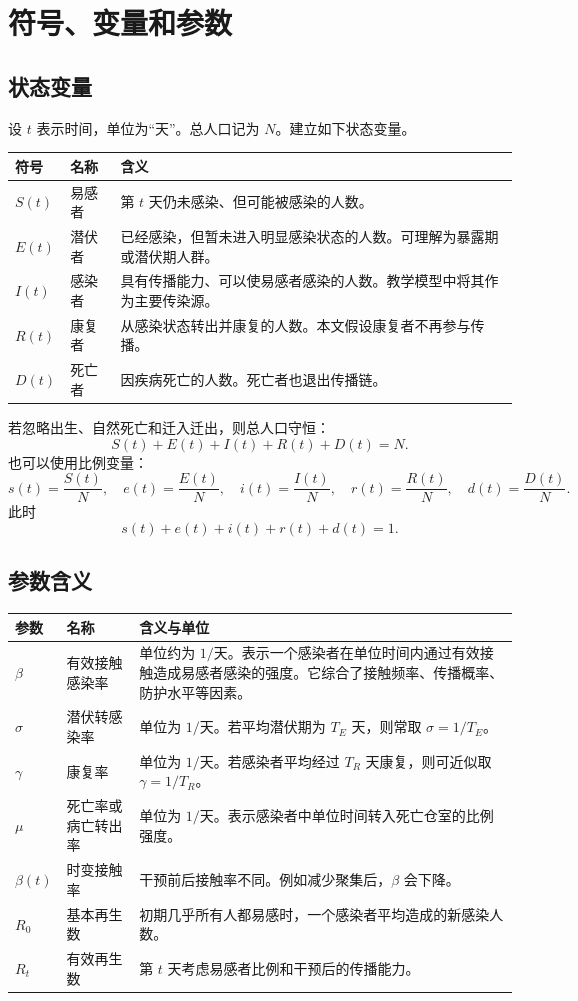 \documentclass[UTF8,12pt,a4paper]{ctexart}
\begin{document}
\section{符号、变量和参数}
\subsection{状态变量}
设 $t$ 表示时间，单位为“天”。总人口记为 $N$。建立如下状态变量。
\begin{longtable}{p{2.2cm}p{4.4cm}p{8.2cm}}
\toprule
符号 & 名称 & 含义 \\
\midrule
$S(t)$ & 易感者 & 第 $t$ 天仍未感染、但可能被感染的人数。\\
$E(t)$ & 潜伏者 & 已经感染，但暂未进入明显感染状态的人数。可理解为暴露期或潜伏期人群。\\
$I(t)$ & 感染者 & 具有传播能力、可以使易感者感染的人数。教学模型中将其作为主要传染源。\\
$R(t)$ & 康复者 & 从感染状态转出并康复的人数。本文假设康复者不再参与传播。\\
$D(t)$ & 死亡者 & 因疾病死亡的人数。死亡者也退出传播链。\\
\bottomrule
\end{longtable}

若忽略出生、自然死亡和迁入迁出，则总人口守恒：
\[
S(t)+E(t)+I(t)+R(t)+D(t)=N.
\]
也可以使用比例变量：
\[
s(t)=\frac{S(t)}{N},\quad e(t)=\frac{E(t)}{N},\quad i(t)=\frac{I(t)}{N},\quad r(t)=\frac{R(t)}{N},\quad d(t)=\frac{D(t)}{N}.
\]
此时
\[
s(t)+e(t)+i(t)+r(t)+d(t)=1.
\]

\subsection{参数含义}
\begin{longtable}{p{2.2cm}p{4.2cm}p{8.4cm}}
\toprule
参数 & 名称 & 含义与单位 \\
\midrule
$\beta$ & 有效接触感染率 & 单位约为 $1/\text{天}$。表示一个感染者在单位时间内通过有效接触造成易感者感染的强度。它综合了接触频率、传播概率、防护水平等因素。\\
$\sigma$ & 潜伏转感染率 & 单位为 $1/\text{天}$。若平均潜伏期为 $T_E$ 天，则常取 $\sigma=1/T_E$。\\
$\gamma$ & 康复率 & 单位为 $1/\text{天}$。若感染者平均经过 $T_R$ 天康复，则可近似取 $\gamma=1/T_R$。\\
$\mu$ & 死亡率或病亡转出率 & 单位为 $1/\text{天}$。表示感染者中单位时间转入死亡仓室的比例强度。\\
$\beta(t)$ & 时变接触率 & 干预前后接触率不同。例如减少聚集后，$\beta$ 会下降。\\
$R_0$ & 基本再生数 & 初期几乎所有人都易感时，一个感染者平均造成的新感染人数。\\
$R_t$ & 有效再生数 & 第 $t$ 天考虑易感者比例和干预后的传播能力。\\
\bottomrule
\end{longtable}
\end{document}
